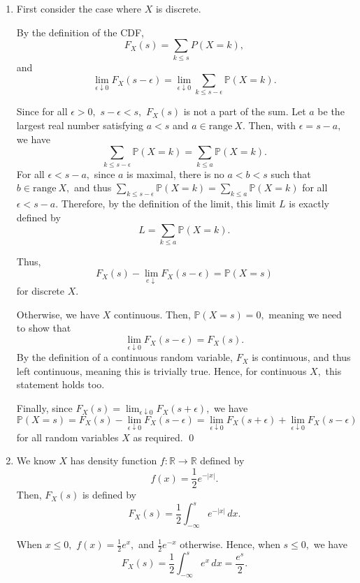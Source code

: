 \documentclass[12pt]{article}
\begin{document}
\begin{enumerate}
  \item First consider the case where $X$ is discrete.

    By the definition of the CDF,
    $$
    F_X(s) = \sum_{k \leq s} P(X = k),
    $$
    and $$\lim_{\epsilon \downarrow 0}F_X(s - \epsilon) =
    \lim_{\epsilon \downarrow 0} \sum_{k \leq s - \epsilon} \mathbb P(X = k).$$

    Since for all $\epsilon > 0,$ $ s - \epsilon < s,$ $F_X(s)$ is
    not a part of the sum. Let $a$ be the largest real number
    satisfying $a < s$ and $a \in \text{range} \ X.$ Then, with
    $\epsilon = s - a,$ we have
    $$
    \sum_{k \leq s - \epsilon} \mathbb P(X = k) = \sum_{k \leq a}
    \mathbb P(X = k).
    $$
    For all $\epsilon < s- a,$ since $a$ is maximal, there is no $a <
    b < s$ such that $b \in \text{range}\ X,$ and thus $\sum_{k \leq
    s - \epsilon} \mathbb P(X = k) = \sum_{k \leq a} \mathbb P(X =
    k)$ for all $\epsilon < s - a.$ Therefore, by the definition of
    the limit, this limit $L$ is exactly defined by
    $$
    L = \sum_{k \leq a } \mathbb P(X = k).
    $$

    Thus, $$F_X(s) - \lim_{e \downarrow } F_{X}(s -\epsilon) =
    \mathbb P(X = s)$$ for discrete $X.$

    Otherwise, we have $X$ continuous. Then, $\mathbb P(X = s) = 0,$
    meaning we need to show that
    $$
    \lim_{\epsilon\downarrow 0} F_X(s - \epsilon ) = F_X(s).
    $$
    By the definition of a continuous random variable, $F_X$ is
    continuous, and thus left continuous, meaning this is trivially
    true. Hence, for continuous $X,$ this statement holds too.

    Finally, since $F_X(s)  = \lim_{\epsilon \downarrow 0}F_X(s +
    \epsilon),$ we have
    $$
    \mathbb P(X =s ) = F_X(s) - \lim_{\epsilon \downarrow 0} F_X(s
    -\epsilon) = \lim_{\epsilon \downarrow 0} F_X(s + \epsilon) +
    \lim_{\epsilon \downarrow 0} F_X(s - \epsilon)
    $$
    for all random variables $X$ as required. \qed

  \item We know $X$ has density function $f: \mathbb R \to \mathbb
    R$ defined by
    $$
    f(x) = \dfrac{1}{2} e^{-|x|}.
    $$
    Then, $F_X(s)$ is defined by
    $$
    F_X(s) = \dfrac{1}{2}\int_{-\infty}^{s} e^{-|x|} \, dx.
    $$

    When $x \leq 0,$ $f(x) = \frac{1}{2}e^{x},$ and
    $\frac{1}{2}e^{-x}$ otherwise. Hence, when $s \leq 0,$ we have
    $$
    F_X(s) = \dfrac{1}{2}\int_{-\infty}^{s} e^{x} \, dx = \dfrac{e^{s}}{2}.
    $$


\end{enumerate}
\end{document}
